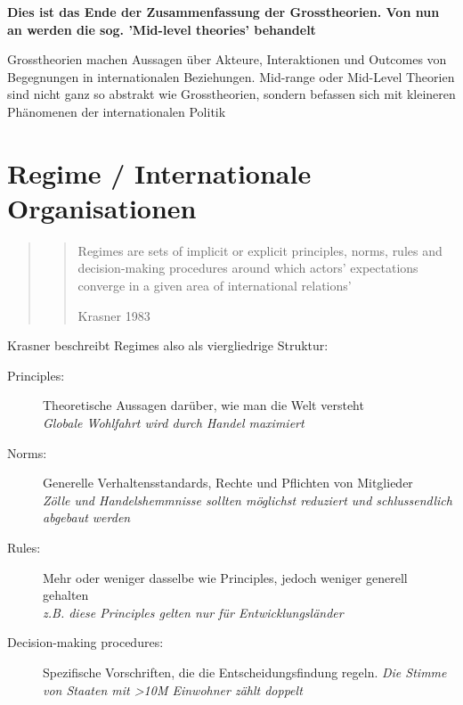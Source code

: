 \documentclass[a4paper, 11pt]{article}
\begin{document}
\hrulefill

\vspace{10px}

\noindent \textbf{Dies ist das Ende der Zusammenfassung der Grosstheorien. Von nun an werden die sog. 'Mid-level theories' behandelt}

\vspace{10px}

\hrulefill

\vspace{30px}

\noindent Grosstheorien machen Aussagen über Akteure, Interaktionen und Outcomes von Begegnungen in internationalen Beziehungen. Mid-range oder Mid-Level Theorien sind nicht ganz so abstrakt wie Grosstheorien, sondern befassen sich mit kleineren Phänomenen der internationalen Politik

\newpage

\section{Regime / Internationale Organisationen} \label{sec:Regime}
\begin{quote}
	\centering
	\blockquote[Krasner 1983]{Regimes are sets of implicit or explicit principles, norms, rules and decision-making procedures around which actors' expectations converge in a given area of international relations'}
\end{quote}

\noindent Krasner beschreibt Regimes also als viergliedrige Struktur:

\begin{description}
	\item[Principles: ] Theoretische Aussagen darüber, wie man die Welt versteht \\
	\textit{Globale Wohlfahrt wird durch Handel maximiert}
	\item[Norms: ] Generelle Verhaltensstandards, Rechte und Pflichten von Mitglieder \\
	\textit{Zölle und Handelshemmnisse sollten möglichst reduziert und schlussendlich abgebaut werden}
	\item[Rules:] Mehr oder weniger dasselbe wie Principles, jedoch weniger generell gehalten \\
	\textit{z.B. diese Principles gelten nur für Entwicklungsländer}
	\item[Decision-making procedures: ] Spezifische Vorschriften, die die Entscheidungsfindung regeln. 
	\textit{Die Stimme von Staaten mit >10M Einwohner zählt doppelt}
\end{description}
\end{document}
